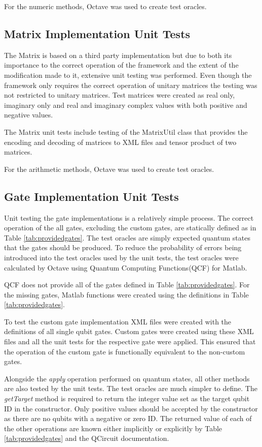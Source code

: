 For the numeric methods, Octave\cite{octweb} was used to create test oracles.

\subsection{Matrix Implementation Unit Tests}
The Matrix is based on a third party implementation but due to both its importance to the correct operation of the framework and the extent of the modification made to it, extensive unit testing was performed.
Even though the framework only requires the correct operation of unitary matrices the testing was not restricted to unitary matrices.
Test matrices were created as real only,  imaginary only and real and imaginary complex values with both positive and negative values.

The Matrix unit tests include testing of the MatrixUtil class that provides the encoding and decoding of matrices to XML files and tensor product of two matrices.

For the arithmetic methods, Octave\cite{octweb} was used to create test oracles.

\subsection{Gate Implementation Unit Tests}
\label{sec:gatetests}
Unit testing the gate implementations is a relatively simple process.
The correct operation of the all gates, excluding the custom gates, are statically defined as in Table \ref{tab:providedgates}.
The test oracles are simply expected quantum states that the gates should be produced.
To reduce the probability of errors being introduced into the test oracles used by the unit tests, the test oracles were calculated by Octave\cite{octweb} using Quantum Computing Functions(QCF) for Matlab\cite{qcfweb}.

QCF does not provide all of the gates defined in Table \ref{tab:providedgates}.
For the missing gates, Matlab functions were created using the definitions in Table \ref{tab:providedgates}.

To test the custom gate implementation XML files were created with the definitions of all single qubit gates.
Custom gates were created using these XML files and all the unit tests for the respective gate were applied.
This ensured that the operation of the custom gate is functionally equivalent to the non-custom gates.

Alongside the \emph{apply} operation performed on quantum states, all other methods are also tested by the unit tests.
The test oracles are much simpler to define.
The \emph{getTarget} method is required to return the integer value set as the target qubit ID in the constructor.
Only positive values should be accepted by the constructor as there are no qubits with a negative or zero ID.
The returned value of each of the other operations are known either implicitly or explicitly by Table \ref{tab:providedgates} and the QCircuit\cite{QCsite} documentation.

